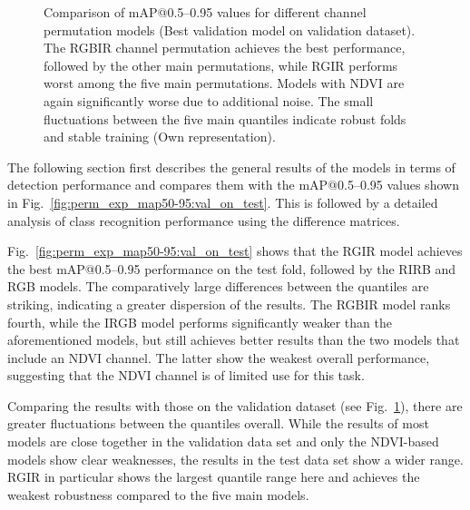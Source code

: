 \begin{figure}[b]
    \centering
    
    \caption[Comparison of \acrshort{mAP}@0.5--0.95 values for different channel permutation models (Best validation model on validation dataset)]{Comparison of \acrshort{mAP}@0.5--0.95 values for different channel permutation models (Best validation model on validation dataset). The \acrshort{RGBIR} channel permutation achieves the best performance, followed by the other main permutations, while \acrshort{RGIR} performs worst among the five main permutations. Models with NDVI are again significantly worse due to additional noise. The small fluctuations between the five main quantiles indicate robust folds and stable training (Own representation).}
    \label{fig:perm_exp_map50-95:val_on_val}
\end{figure}
The following section first describes the general results of the models in terms of detection performance and compares them with the \acrshort{mAP}@0.5--0.95 values shown in Fig.~\ref{fig:perm_exp_map50-95:val_on_test}. This is followed by a detailed analysis of class recognition performance using the difference matrices.  

Fig.~\ref{fig:perm_exp_map50-95:val_on_test} shows that the \acrshort{RGIR} model achieves the best \acrshort{mAP}@0.5--0.95 performance on the test fold, followed by the \acrshort{RIRB} and \acrshort{RGB} models. The comparatively large differences between the quantiles are striking, indicating a greater dispersion of the results. The \acrshort{RGBIR} model ranks fourth, while the \acrshort{IRGB} model performs significantly weaker than the aforementioned models, but still achieves better results than the two models that include an NDVI channel. The latter show the weakest overall performance, suggesting that the NDVI channel is of limited use for this task.  

Comparing the results with those on the validation dataset (see Fig.~\ref{fig:perm_exp_map50-95:val_on_val}), there are greater fluctuations between the quantiles overall. While the results of most models are close together in the validation data set and only the NDVI-based models show clear weaknesses, the results in the test data set show a wider range. \acrshort{RGIR} in particular shows the largest quantile range here and achieves the weakest robustness compared to the five main models.
 
